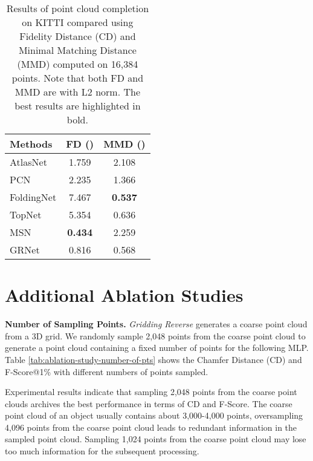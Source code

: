 \documentclass[runningheads]{llncs}
\begin{document}
\begin{table*}[!t]
  \setlength\tabcolsep{12pt}
  \caption{Results of point cloud completion on KITTI compared using Fidelity Distance (CD) and Minimal Matching Distance (MMD) computed on 16,384 points. Note that both FD and MMD are with L2 norm. The best results are highlighted in bold.}
  \centering
  \begin{tabular}{l|cc}
    \toprule
    Methods      & FD () 
                 & MMD  () \\
    \midrule  
    AtlasNet \cite{DBLP:conf/cvpr/GroueixFKRA18}    
                 & 1.759      & 2.108\\ 
    PCN \cite{DBLP:conf/ThreeDim/YuanKHMH18}
                 & 2.235      & 1.366 \\
    FoldingNet \cite{DBLP:conf/cvpr/YangFST18}
                 & 7.467      & \bf{0.537} \\
    TopNet \cite{DBLP:conf/cvpr/TchapmiKR0S19}
                 & 5.354      & 0.636 \\
    MSN \cite{DBLP:conf/aaai/LiuSYSH20}
                 & \bf{0.434} & 2.259 \\
    GRNet        & 0.816      & 0.568 \\
  	\bottomrule
  \end{tabular}
  \label{tab:kitti-reconstruction}
\end{table*}

\section{Additional Ablation Studies}
\label{sec:ablation-studies}

\noindent \textbf{Number of Sampling Points.}
{\it Gridding Reverse} generates a coarse point cloud from a 3D grid.
We randomly sample 2,048 points from the coarse point cloud to generate a point cloud containing a fixed number of points for the following MLP.
Table \ref{tab:ablation-study-number-of-pts} shows the Chamfer Distance (CD) and F-Score@1\% with different numbers of points sampled.

Experimental results indicate that sampling 2,048 points from the coarse point clouds archives the best performance in terms of CD and F-Score.
The coarse point cloud of an object usually contains about 3,000-4,000 points, oversampling 4,096 points from the coarse point cloud leads to redundant information in the sampled point cloud.
Sampling 1,024 points from the coarse point cloud may lose too much information for the subsequent processing.
\end{document}
